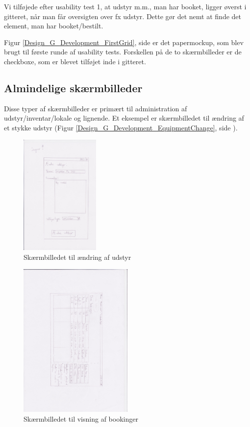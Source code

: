 Vi tilføjede efter usability test 1, at udstyr m.m., man har booket, ligger øverst i gitteret, når man får oversigten over fx udstyr. Dette gør det nemt at finde det element, man har booket/bestilt.

Figur \ref{Design_G_Development_FirstGrid}, side \pageref{Design_G_Development_FirstGrid} er det papermockup, som blev brugt til første runde af usability tests. Forskellen på de to skærmbilleder er de checkboxe, som er blevet tilføjet inde i gitteret. 

\subsection{Almindelige skærmbilleder}
\label{Design_G_Development_NormalWindows}
Disse typer af skærmbilleder er primært til administration af udstyr/inventar/lokale og lignende. Et eksempel er skærmbilledet til ændring af et stykke udstyr (Figur \ref{Design_G_Development_EquipmentChange}, side \pageref{Design_G_Development_EquipmentChange}). 

\begin{figure}[h!]
  \centering
    \includegraphics[width=0.35\textwidth]{Appendix/GUI-Prototype/PaperMockup/AendreUdstyr_001}
  \caption{Skærmbilledet til ændring af udstyr}
\label{Design_G_Development_EquipmentChangeV1}
\end{figure} 

\begin{figure}[h!]
  \centering
    \includegraphics[width=0.5\textwidth,  angle=90]{Appendix/GUI-Prototype/PaperMockup/DineBookinger_001}
  \caption{Skærmbilledet til visning af bookinger}
\label{Design_G_Development_YourBookings}
\end{figure} 

